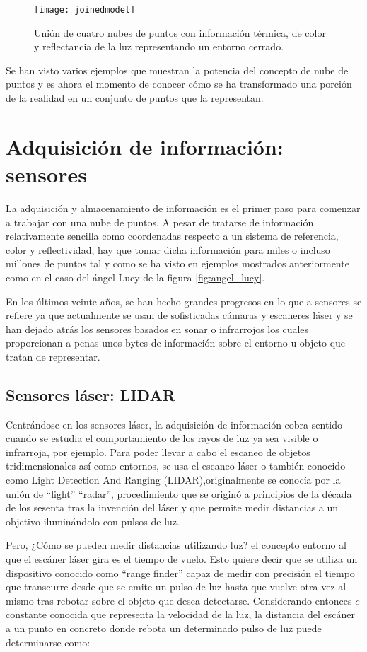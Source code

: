 \begin{figure}
\centering
\texttt{[image: joinedmodel]}
\caption{Unión de cuatro nubes de puntos con información térmica, de color y reflectancia de la luz representando un entorno cerrado.}\label{fig:joined_model}
\end{figure}


Se han visto varios ejemplos que muestran la potencia del concepto de nube de puntos y es ahora el momento de conocer cómo se ha transformado una porción de la realidad en un conjunto de puntos que la representan.

\iffalse
\section{Adquisición de información: sensores}
La adquisición y almacenamiento de información es el primer paso para comenzar a trabajar con una nube de puntos. A pesar de tratarse de información relativamente sencilla como coordenadas respecto a un sistema de referencia, color y reflectividad, hay que tomar dicha información para miles o incluso millones de puntos tal y como se ha visto en ejemplos mostrados anteriormente como en el caso del ángel Lucy de la figura \ref{fig:angel_lucy}. 

En los últimos veinte años, se han hecho grandes progresos en lo que a sensores se refiere ya que actualmente se usan de sofisticadas cámaras y escaneres láser y se han dejado atrás los sensores basados en sonar o infrarrojos los cuales proporcionan a penas unos bytes de información sobre el entorno u objeto que tratan de representar.

\subsection{Sensores láser: LIDAR}
Centrándose en los sensores láser, la adquisición de información cobra sentido cuando se estudia el comportamiento de los rayos de luz ya sea visible o infrarroja, por ejemplo. Para poder llevar a cabo el escaneo de objetos tridimensionales así como entornos, se usa el escaneo láser o también conocido como Light Detection And Ranging (LIDAR),originalmente se conocía por la unión de ``light'' ``radar'', 
procedimiento que se originó a principios de la década de los sesenta tras la invención del láser y que permite medir distancias a un objetivo iluminándolo con pulsos de luz.

Pero, ¿Cómo se pueden medir distancias utilizando luz?\cite{lidar} el concepto entorno al que el escáner láser gira es el tiempo de vuelo. Esto quiere decir que se utiliza un dispositivo conocido como ``range finder'' capaz de medir con precisión el tiempo que transcurre desde que se emite un pulso de luz hasta que vuelve otra vez al mismo tras rebotar sobre el objeto que desea detectarse. Considerando entonces $c$ constante conocida que representa la velocidad de la luz, la distancia del escáner a un punto en concreto donde rebota un determinado pulso de luz puede determinarse como:

